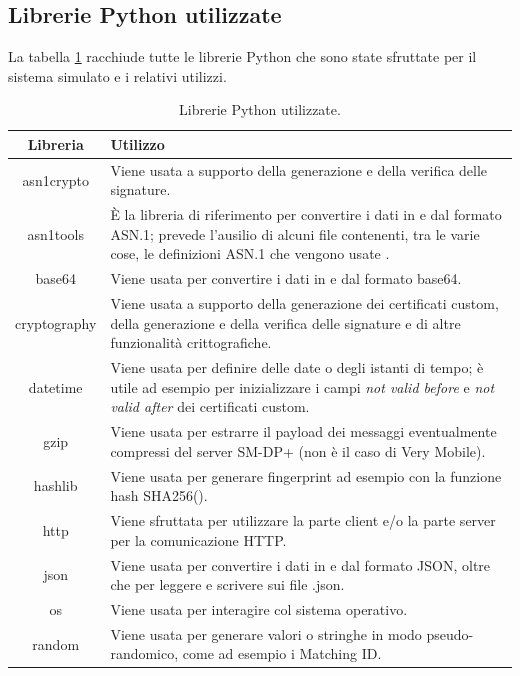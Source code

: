 \documentclass[10pt, oneside]{book}
\begin{document}
\subsection{Librerie Python utilizzate}
La tabella \ref{tab:libraries} racchiude tutte le librerie Python che sono state sfruttate per il sistema simulato e i relativi utilizzi.\\
\begin{table}[h!]
\begin{center}
\captionsetup{skip=4pt}
\caption{Librerie Python utilizzate.}
\label{tab:libraries}
\begin{tabularx}{\textwidth}{|c|X|}
\hline
\textbf{Libreria} & \textbf{Utilizzo}\\
\hline
asn1crypto & Viene usata a supporto della generazione e della verifica delle signature.\\
\hline
asn1tools & È la libreria di riferimento per convertire i dati in e dal formato ASN.1; prevede l'ausilio di alcuni file contenenti, tra le varie cose, le definizioni ASN.1 che vengono usate \cite{RSP-definitions}.\\
\hline
base64 & Viene usata per convertire i dati in e dal formato base64.\\
\hline
cryptography & Viene usata a supporto della generazione dei certificati custom, della generazione e della verifica delle signature e di altre funzionalità crittografiche.\\
\hline
datetime & Viene usata per definire delle date o degli istanti di tempo; è utile ad esempio per inizializzare i campi \textit{not valid before} e \textit{not valid after} dei certificati custom.\\
\hline
gzip & Viene usata per estrarre il payload dei messaggi eventualmente compressi del server SM-DP+ (non è il caso di Very Mobile).\\
\hline
hashlib & Viene usata per generare fingerprint ad esempio con la funzione hash SHA256().\\
\hline
http & Viene sfruttata per utilizzare la parte client e/o la parte server per la comunicazione HTTP.\\
\hline
json & Viene usata per convertire i dati in e dal formato JSON, oltre che per leggere e scrivere sui file .json.\\
\hline
os & Viene usata per interagire col sistema operativo.\\
\hline
random & Viene usata per generare valori o stringhe in modo pseudo-randomico, come ad esempio i Matching ID.\\

\end{tabularx}
\end{center}
\end{table}
\end{document}
